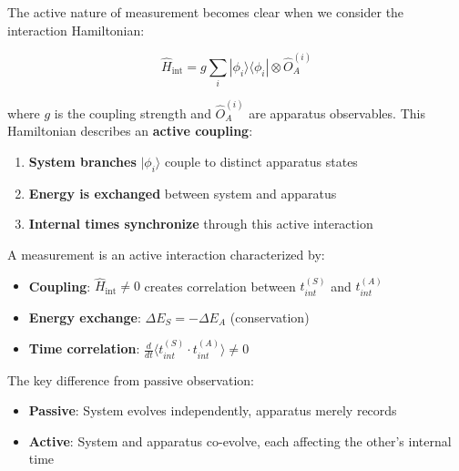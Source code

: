 The active nature of measurement becomes clear when we consider the interaction Hamiltonian:

\begin{equation}
    \hat{H}_{\text{int}} = g \sum_i |\phi_i\rangle\langle\phi_i| \otimes \hat{O}_A^{(i)}
\end{equation}

where $g$ is the coupling strength and $\hat{O}_A^{(i)}$ are apparatus observables. This Hamiltonian describes an \textbf{active coupling}:

\begin{enumerate}
    \item \textbf{System branches} $|\phi_i\rangle$ couple to distinct apparatus states
    \item \textbf{Energy is exchanged} between system and apparatus
    \item \textbf{Internal times synchronize} through this active interaction
\end{enumerate}

\begin{definition}
A measurement is an active interaction characterized by:
\begin{itemize}
    \item \textbf{Coupling}: $\hat{H}_{\text{int}} \neq 0$ creates correlation between $t_{int}^{(S)}$ and $t_{int}^{(A)}$
    \item \textbf{Energy exchange}: $\Delta E_S = -\Delta E_A$ (conservation)
    \item \textbf{Time correlation}: $\frac{d}{dt}\langle t_{int}^{(S)} \cdot t_{int}^{(A)} \rangle \neq 0$
\end{itemize}
\end{definition}

The key difference from passive observation:
\begin{itemize}
    \item \textbf{Passive}: System evolves independently, apparatus merely records
    \item \textbf{Active}: System and apparatus co-evolve, each affecting the other's internal time
\end{itemize}

